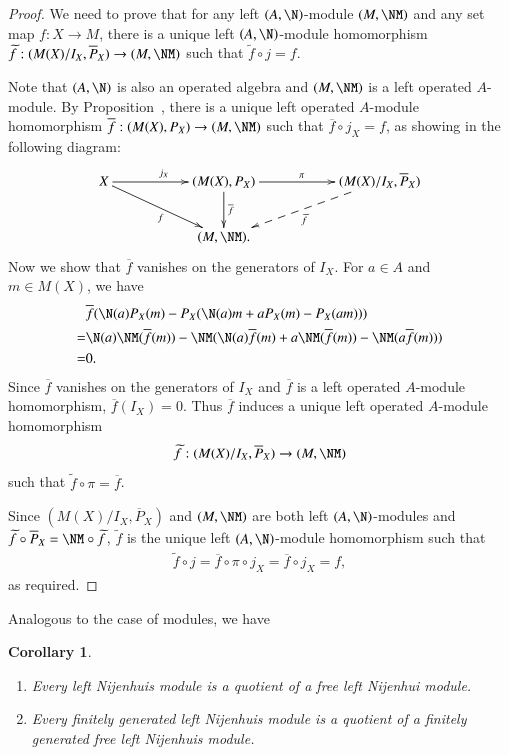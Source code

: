 \documentclass[12pt]{amsart}
\newtheorem{coro}[theorem]{Corollary}
\theoremstyle{definition}
\renewcommand\tilde[1]{\widetilde{#1}}
\begin{document}
\begin{proof}
We need to prove that for any left $(A,\N)$-module $(M,\NM)$ and any set map $f: X\to M$, there is a unique left $(A,\N)$-module homomorphism $\tilde{f}: (M(X)/I_X, \overline{P}_X) \to (M, \NM)$ such that $\tilde{f} \circ j=f$.

Note that $(A,\N)$ is also an operated algebra and $(M,\NM)$ is a left operated $A$-module. By Proposition~, there is a unique left operated $A$-module homomorphism
$\overline{f}: (M(X),P_X) \to (M, \NM)$ such that $\overline{f} \circ j_X = f$,
as showing in the following diagram:
$$
\xymatrix{
X\ar^{j_X}[rr] \ar_{f}[drr] &&(M(X), P_X)\ar^{\pi}[rr]  \ar^{\overline{f}}[d]
&& (M(X)/I_X, \overline{P}_X)\ar@{-->}^{\tilde{f}}[dll] \\
&&(M,\NM).&&
}
$$
Now we show that $\overline{f}$ vanishes on the generators of $I_X$. For $a \in A$ and $m\in M(X)$, we have
\begin{align*}
& \overline{f}(\N(a)P_X(m) - P_X(\N(a)m+a P_X(m) -P_X(am)))\\
=& \N(a)\NM(\overline{f}(m)) - \NM(\N(a)\overline{f}(m)+a \NM(\overline{f}(m)) - \NM(a\overline{f}(m)))\\
=& 0.
\end{align*}
Since $\overline{f}$ vanishes on the generators of $I_X$ 
and $\overline{f}$ is a left operated $A$-module homomorphism, $\overline{f}(I_X)=0$. Thus $\overline{f}$ induces a unique left operated $A$-module homomorphism
$$\tilde{f}:(M(X)/I_X,\overline{P}_X) \to (M,\NM)$$
such that $\tilde{f}\circ \pi = \overline{f}$.

Since $(M(X)/I_X, \overline{P}_X)$ and $(M, \NM)$ are both left $(A,\N)$-modules and $\tilde{f} \circ \overline{P}_X= \NM \circ \tilde{f}$, $\tilde{f}$ is the unique left $(A,\N)$-module homomorphism such that
\begin{align*}
\tilde{f}\circ j = \overline{f}\circ \pi\circ j_X = \overline{f}\circ j_X = f,
\end{align*}
as required. 
\end{proof}

Analogous to the case of modules, we have
\begin{coro}
\begin{enumerate}
\item Every left Nijenhuis module is a quotient of a free left Nijenhui module.  

\item Every finitely generated left Nijenhuis module is a quotient of a finitely generated free left Nijenhuis module. 
\end{enumerate}
\end{coro}
\end{document}
